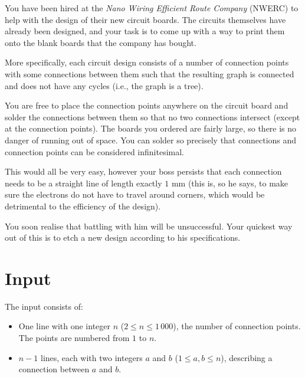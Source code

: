
%
%
You have been hired at the \emph{Nano Wiring Efficient Route Company}
(NWERC) to help with the
design of their new circuit boards. The circuits themselves have
already been designed, and your task is to come up with a way to print
them onto the blank boards that the company has bought.

More specifically, each circuit design consists of a number of
connection points with some connections between them such that the
resulting graph is connected and does not have any cycles (i.e., the
graph is a tree).

You are free to place the connection points anywhere on the circuit board
and solder the connections between them so that no two connections
intersect (except at the connection points). The boards you ordered
are fairly large, so there is no danger of running out of space.
You can solder so precisely that connections and connection points can be
considered infinitesimal.

This would all be very easy, however your boss persists that each
connection needs to be a straight line of length exactly $1\text{ mm}$ (this
is, so he says, to make sure the electrons do not have to travel
around corners, which would be detrimental to the efficiency of the
design).

You soon realise that battling with him will be unsuccessful. Your quickest way
out of this is to etch a new design according to his specifications.

%

\section*{Input}

The input consists of:
\begin{itemize}
  \item One line with one integer $n$ ($2 \le n \le 1\,000$), the number
    of connection points.  The points are numbered from $1$ to $n$.
  \item $n-1$ lines, each with two integers $a$ and $b$ ($1 \le a,b \le n$),
    describing a connection between $a$ and $b$.
\end{itemize}

